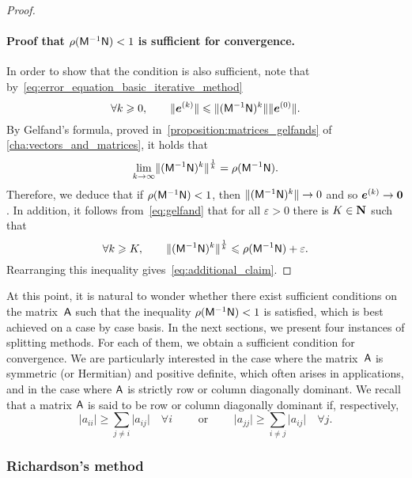 \begin{proof}
    \paragraph{Proof that $\rho(\mathsf M^{-1} \mathsf N) < 1$ is sufficient for convergence.}
    In order to show that the condition is also sufficient,
    note that by~\eqref{eq:error_equation_basic_iterative_method}
    \[
        \forall k \geq 0, \qquad
        \norm{\vect e^{(k)}}
        \leq \norm[bigl]{(\mat M^{-1} \mat N)^{k}} \norm{\vect e^{(0)}}.
    \]
    By Gelfand's formula,
    proved in~\cref{proposition:matrices_gelfands} of \cref{cha:vectors_and_matrices},
    it holds that
    \begin{equation}
        \label{eq:gelfand}
        \lim_{k \to \infty} \norm[bigl]{(\mat M^{-1} \mat N)^{k}}^{\frac{1}{k}} = \rho(\mat M^{-1} \mat N).
    \end{equation}
    Therefore, we deduce that if $\rho(\mathsf M^{-1} \mathsf N) < 1$,
    then $\norm[bigl]{(\mat M^{-1} \mat N)^{k}} \to 0$ and so $\mathbf{\boldsymbol{e}}^{(k)} \to \mathbf{\boldsymbol{0}}$.
    In addition, it follows from~\eqref{eq:gelfand} that for all $\varepsilon > 0$ there is $K \in \mathbf N$ such that
    \[
        \forall k \geq K, \qquad
        \norm[bigl]{(\mat M^{-1} \mat N)^{k}}^{\frac{1}{k}} \leq \rho(\mat M^{-1} \mat N) + \varepsilon.
    \]
    Rearranging this inequality gives~\eqref{eq:additional_claim}.
\end{proof}

At this point,
it is natural to wonder whether there exist sufficient conditions on the matrix~$\mathsf A$ such that the inequality $\rho(\mathsf M^{-1} \mathsf N) < 1$ is satisfied,
which is best achieved on a case by case basis.
In the next sections,
we present four instances of splitting methods.
For each of them,
we obtain a sufficient condition for convergence.
We are particularly interested in the case where the matrix~$\mathsf A$ is symmetric (or Hermitian) and positive definite,
which often arises in applications,
and in the case where $\mathsf A$ is strictly row or column diagonally dominant.
We recall that a matrix $\mathsf A$ is said to be row or column diagonally dominant
if, respectively,
\[
    \lvert a_{ii} \rvert \geq \sum_{j \neq i} \lvert a_{ij} \rvert \quad \forall i
    \qquad \text{ or } \qquad
    \lvert a_{jj} \rvert \geq \sum_{i \neq j} \lvert a_{ij} \rvert \quad \forall j.
\]

\subsubsection{Richardson's method}%
\label{ssub:richardson_s_method}

